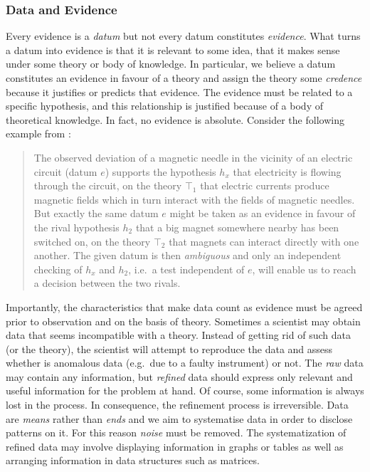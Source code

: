 \documentclass[
  12pt,
]{book}
\begin{document}
\subsubsection{Data and Evidence}\label{data-and-evidence}

Every evidence is a \emph{datum} but not every datum constitutes \emph{evidence}. What turns a datum into evidence is that it is relevant to some idea, that it makes sense under some theory or body of knowledge. In particular, we believe a datum constitutes an evidence in favour of a theory and assign the theory some \emph{credence} because it justifies or predicts that evidence. The evidence must be related to a specific hypothesis, and this relationship is justified because of a body of theoretical knowledge. In fact, no evidence is absolute. Consider the following example from \citep{bunge2017philosophy}:

\begin{quote}
The observed deviation of a magnetic needle in the vicinity of an electric circuit (datum \(e\)) supports the hypothesis \(h_x\) that electricity is flowing through the circuit, on the theory \(⊤_1\) that electric currents produce magnetic fields which in turn interact with the fields of magnetic needles. But exactly the same datum \(e\) might be taken as an evidence in favour of the rival hypothesis \(h_2\) that a big magnet somewhere nearby has been switched on, on the theory \(⊤_2\) that magnets can interact directly with one another. The given datum is then \emph{ambiguous} and only an independent checking of \(h_x\) and \(h_2\), i.e.~a test independent of \(e\), will enable us to reach a decision between the two rivals.
\end{quote}

Importantly, the characteristics that make data count as evidence must be agreed prior to observation and on the basis of theory. Sometimes a scientist may obtain data that seems incompatible with a theory. Instead of getting rid of such data (or the theory), the scientist will attempt to reproduce the data and assess whether is anomalous data (e.g.~due to a faulty instrument) or not. The \emph{raw} data may contain any information, but \emph{refined} data should express only relevant and useful information for the problem at hand. Of course, some information is always lost in the process. In consequence, the refinement process is irreversible. Data are \emph{means} rather than \emph{ends} and we aim to systematise data in order to disclose patterns on it. For this reason \emph{noise} must be removed. The systematization of refined data may involve displaying information in graphs or tables as well as arranging information in data structures such as matrices.
\end{document}
